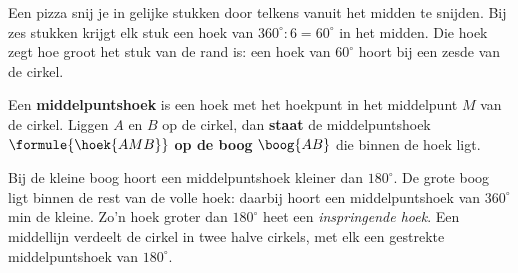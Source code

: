 Een pizza snij je in gelijke stukken door telkens vanuit het midden te snijden. Bij zes stukken krijgt elk stuk een hoek van $360^\circ : 6 = 60^\circ$ in het midden. Die hoek zegt hoe groot het stuk van de rand is: een hoek van $60^\circ$ hoort bij een zesde van de cirkel.

\begin{theorie}
\begin{minipage}[t]{.64\linewidth}
\vspace{0pt}
Een \textbf{\textcolor{accent}{middelpuntshoek}} is een hoek met het hoekpunt in het middelpunt $M$ van de cirkel. Liggen $A$ en $B$ op de cirkel, dan \textbf{\textcolor{accent}{staat}} de middelpuntshoek $\formule{\hoek{AMB}}$ \textbf{\textcolor{accent}{op de boog}} $\boog{AB}$ die binnen de hoek ligt.
\end{minipage}\hfill
\begin{minipage}[t]{.32\linewidth}
\vspace{0pt}
\centering
{}
\end{minipage}
\end{theorie}

Bij de kleine boog hoort een middelpuntshoek kleiner dan $180^\circ$. De grote boog ligt binnen de rest van de volle hoek: daarbij hoort een middelpuntshoek van $360^\circ$ min de kleine. Zo'n hoek groter dan $180^\circ$ heet een \emph{inspringende hoek}. Een middellijn verdeelt de cirkel in twee halve cirkels, met elk een gestrekte middelpuntshoek van $180^\circ$.

